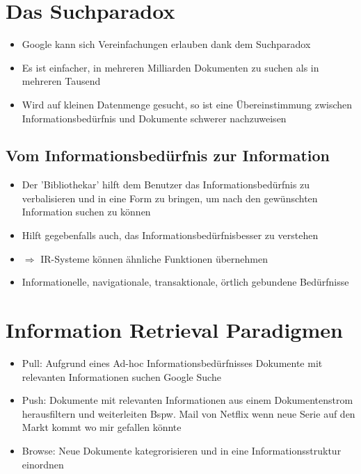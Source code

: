 \documentclass{report}
\theoremstyle{definition}
\theoremstyle{example}
\begin{document}
\section{Das Suchparadox}
\begin{itemize}
   \item Google kann sich Vereinfachungen erlauben dank dem Suchparadox
   \item Es ist einfacher, in mehreren Milliarden Dokumenten zu suchen als in mehreren Tausend
   \item Wird auf kleinen Datenmenge gesucht, so ist eine Übereinstimmung zwischen Informationsbedürfnis und Dokumente schwerer nachzuweisen
\end{itemize}

   \subsection{Vom Informationsbedürfnis zur Information}
\begin{itemize}
   \item Der 'Bibliothekar' hilft dem Benutzer das Informationsbedürfnis zu verbalisieren und in eine Form zu bringen, um nach den gewünschten Information suchen zu können
   \item Hilft gegebenfalls auch, das Informationsbedürfnisbesser zu verstehen
   \item $\Rightarrow$ IR-Systeme können ähnliche Funktionen übernehmen
   \item Informationelle, navigationale, transaktionale, örtlich gebundene Bedürfnisse
\end{itemize}

\section{Information Retrieval Paradigmen}
\begin{itemize}
   \item Pull: Aufgrund eines Ad-hoc Informationsbedürfnisses Dokumente mit relevanten Informationen suchen
   \subitem Google Suche 
   \item Push: Dokumente mit relevanten Informationen aus einem Dokumentenstrom herausfiltern und weiterleiten
   \subitem Bspw. Mail von Netflix wenn neue Serie auf den Markt kommt wo mir gefallen könnte
   \item Browse: Neue Dokumente kategrorisieren und in eine Informationsstruktur einordnen 
\end{itemize}
\end{document}
